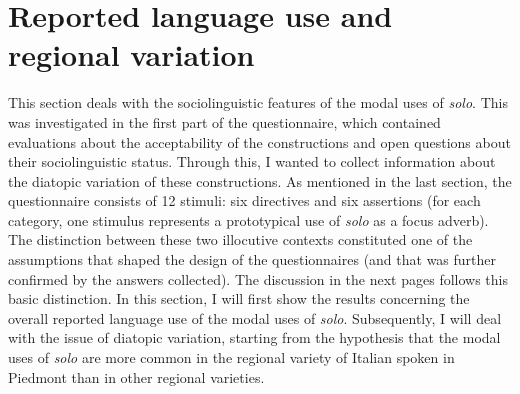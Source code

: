 \section{Reported language use and regional variation}
\largerpage[-4]
\hypertarget{Toc124860672}{}
This section deals with the sociolinguistic features of the modal uses of \textit{solo}. This was investigated in the first part of the questionnaire, which contained evaluations about the acceptability of the constructions and open questions about their sociolinguistic status. Through this, I wanted to collect information about the diatopic variation of these constructions. As mentioned in the last section, the questionnaire consists of 12 stimuli: six directives and six assertions (for each category, one stimulus represents a prototypical use of \textit{solo} as a focus adverb). The distinction between these two illocutive contexts constituted one of the assumptions that shaped the design of the questionnaires (and that was further confirmed by the answers collected). The discussion in the next pages follows this basic distinction. In this section, I will first show the results concerning the overall reported language use of the modal uses of \textit{solo}. Subsequently, I will deal with the issue of diatopic variation, starting from the hypothesis that the modal uses of \textit{solo} are more common in the regional variety of Italian spoken in Piedmont than in other regional varieties.


